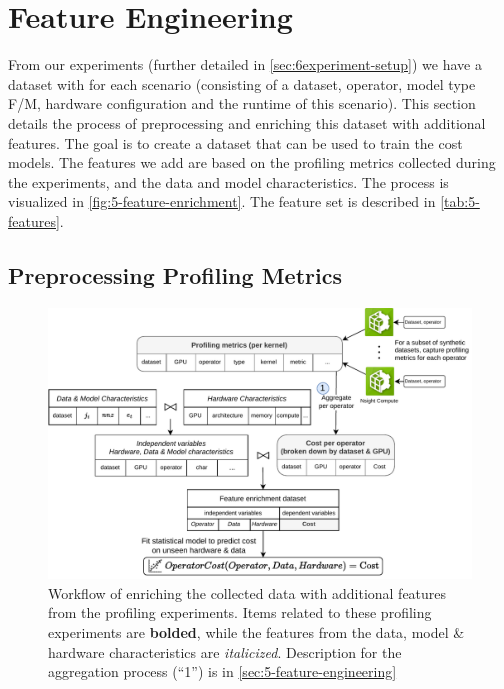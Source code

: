 \section{Feature Engineering}
\label{sec:5-feature-engineering}
From our experiments (further detailed in \autoref{sec:6experiment-setup}) we have a dataset with for each scenario (consisting of a dataset, operator, model type F/M,  hardware configuration and the runtime of this scenario). This section details the process of preprocessing and enriching this dataset with additional features. The goal is to create a dataset that can be used to train the cost models. The features we add are based on the profiling metrics collected during the experiments, and the data and model characteristics. The process is visualized in \autoref{fig:5-feature-enrichment}. The feature set is described in \autoref{tab:5-features}.


\subsection{Preprocessing Profiling Metrics}
\begin{figure}[ht]
    \centering
    \includegraphics[width=\linewidth]{chapters/05_cost_estimation/figures/feature-engineering.pdf}
    \caption[Feature enrichment workflow]{Workflow of enriching the collected data with additional features from the profiling experiments. Items related to these profiling experiments are \textbf{bolded}, while the features from the data, model \& hardware characteristics are \textit{italicized}. Description for the aggregation process (“1”) is in \autoref{sec:5-feature-engineering}}
    \label{fig:5-feature-enrichment}
\end{figure}

